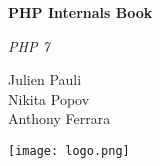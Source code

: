 \begin{titlepage}
    \begin{center}
        \vspace*{1cm}
        \Huge
        \textbf{PHP Internals Book}
        \vspace{0.5cm}
        
        \vfill
        \large
        \textit{PHP 7}
        \vfill

        \normalsize
        Julien Pauli \\
        Nikita Popov \\
        Anthony Ferrara

        \vfill        
        \texttt{[image: logo.png]}
    \end{center}
\end{titlepage}